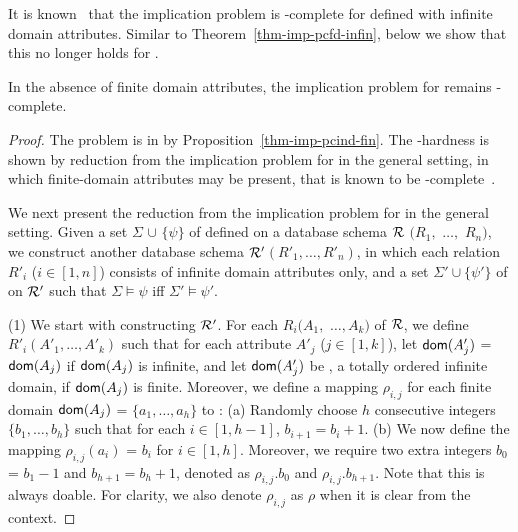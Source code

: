 It is known~\cite{tcs-CINDs} that the implication problem is
\PSPACE-complete for \CINDs defined with infinite domain
attributes. Similar to Theorem~\ref{thm-imp-pcfd-infin},
 below we show that this no longer holds for \pCINDs.


\begin{theorem}
\label{thm-imp-pcind-infin} In the absence of finite domain
attributes, the implication problem for \pCINDs remains
\EXPTIME-complete.
\end{theorem}
\vspace{-1ex}

\begin{proof} The problem is in \EXPTIME by
Proposition~\ref{thm-imp-pcind-fin}. The \EXPTIME-hardness is
shown by reduction from the implication problem for \CINDs in the
general setting, in which finite-domain attributes may be present, that is known to be \EXPTIME-complete~\cite{tcs-CINDs}. 


We next present the reduction from the implication problem for
\CINDs in the general setting. Given a set $\Sigma$ $\cup$ $\{\psi\}$ of \CINDs
defined on a database schema ${\cal R}$ $(R_1,$ $\ldots,$ $R_n)$, we
construct another database schema ${\cal R'}$$(R'_1,\ldots, R'_n)$,
in which each relation $R'_i$ ($i\in[1, n]$) consists of infinite
domain attributes only, and a set $\Sigma'\cup\{\psi'\}$ of \pCINDs
on ${\cal R'}$ such that $\Sigma\models\psi$ iff
$\Sigma'\models\psi'$.

\bi
\item[(1)]
We start with constructing ${\cal R'}$. For each
$R_i(A_1,$ $\ldots, A_k)$ of ${\cal R}$, we define
$R'_i(A'_1,\ldots,A'_k)$ such that for each attribute $A'_j$
($j\in[1, k]$), let $\protect\mathsf{dom}(A'_j)$ = $\protect\mathsf{dom}(A_j)$ if $\protect\mathsf{dom}(A_j)$ is
infinite, and let $\protect\mathsf{dom}(A'_j)$ be , a totally ordered
infinite domain, if $\protect\mathsf{dom}(A_j)$ is finite. Moreover, we define a mapping $\rho_{i,j}$  for
each finite domain $\protect\mathsf{dom}(A_j)$ = $\{a_1,\ldots,a_h\}$ to
: (a) Randomly choose $h$ consecutive integers $\{b_1,
\ldots, b_h\}$ such that for each $i\in[1, h-1]$, $b_{i+1} = b_i +
1$. (b) We now define the mapping $\rho_{i,j}(a_i)$ = $b_i$ for
$i\in[1, h]$. Moreover, we require two extra integers $b_0$ = $b_1 -
1$ and $b_{h+1} = b_h + 1$, denoted as $\rho_{i,j}.b_0$ and
$\rho_{i,j}.b_{h+1}$. Note that this is always doable. For clarity,
we also denote $\rho_{i,j}$ as $\rho$ when it is clear from the
context.


\end{proof}
